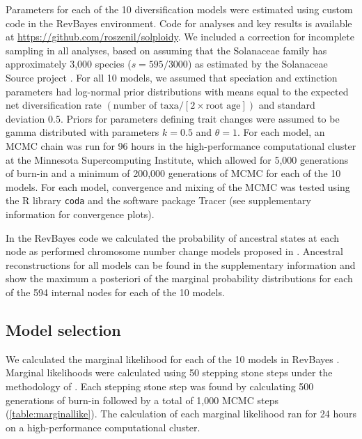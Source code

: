 Parameters for each of the 10 diversification models were estimated using custom code in the RevBayes \citep{hoehna_2016} environment.
Code for analyses and key results is available at \url{https://github.com/roszenil/solploidy}.
We included a correction for incomplete sampling in all analyses, based on assuming that the Solanaceae family has approximately 3,000 species ($s=595/3000$) as estimated by the Solanaceae Source project \citep{solsource}.
For all 10 models, we assumed that speciation and extinction parameters had log-normal prior distributions with means equal to the expected net diversification rate $(\text{number of taxa} / [2 \times \text{root age}])$ and standard deviation $0.5$.
Priors for parameters defining trait changes were assumed to be gamma distributed with parameters $k=0.5$ and $\theta=1$. 
For each model, an MCMC chain was run for 96 hours in the high-performance computational cluster at the Minnesota Supercomputing Institute, which allowed for 5,000 generations of burn-in and a minimum of 200,000 generations of MCMC for each of the 10 models. %
For each model, convergence and mixing of the MCMC was tested using the R library \texttt{coda} and the software package Tracer (see supplementary information for convergence plots). %

In the RevBayes code we calculated the probability of ancestral states at each node as performed chromosome number change models proposed in  \citet{freyman_2017}. Ancestral reconstructions for all models can be found in the supplementary information and show the maximum a posteriori of the marginal probability distributions for each of the 594 internal nodes for each of the 10 models.

\subsection{Model selection}

We calculated the marginal likelihood for each of the 10 models in RevBayes \citep{hoehna_2016}.
Marginal likelihoods were calculated using 50 stepping stone steps under the methodology of \citet{xie_2010}.
Each stepping stone step was found by calculating 500 generations of burn-in followed by a total of 1,000 MCMC steps (\cref{table:marginallike}).
The calculation of each marginal likelihood ran for 24 hours on a high-performance computational cluster.

